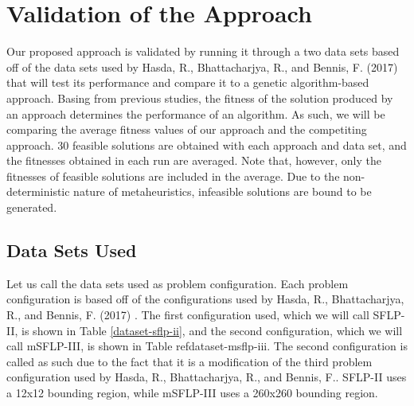 \chapter{Validation of the Approach}
Our proposed approach is validated by running it through a two data sets based off of the data sets used by Hasda, R., Bhattacharjya, R., and Bennis, F. (2017) \cite{Hasda2017} that will test its performance and compare it to a genetic algorithm-based approach. Basing from previous studies, the fitness of the solution produced by an approach determines the performance of an algorithm. As such, we will be comparing the average fitness values of our approach and the competiting approach. 30 feasible solutions are obtained with each approach and data set, and the fitnesses obtained in each run are averaged. Note that, however, only the fitnesses of feasible solutions are included in the average. Due to the non-deterministic nature of metaheuristics, infeasible solutions are bound to be generated.

\section{Data Sets Used}
Let us call the data sets used as problem configuration. Each problem configuration is based off of the configurations used by Hasda, R., Bhattacharjya, R., and Bennis, F. (2017) \cite{Hasda2017}. The first configuration used, which we will call SFLP-II, is shown in Table \ref{dataset-sflp-ii}, and the second configuration, which we will call mSFLP-III, is shown in Table ref{dataset-msflp-iii}. The second configuration is called as such due to the fact that it is a modification of the third problem configuration used by Hasda, R., Bhattacharjya, R., and Bennis, F.. SFLP-II uses a 12x12 bounding region, while mSFLP-III uses a 260x260 bounding region.

